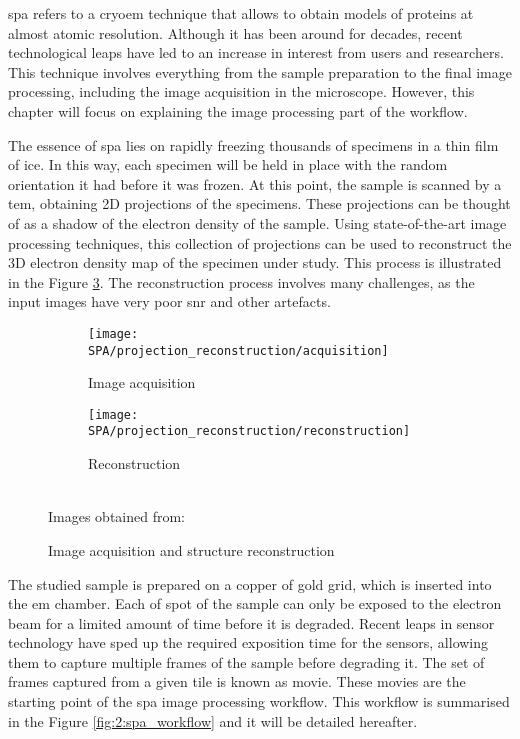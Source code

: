 \documentclass[../main.tex]{subfiles}
\begin{document}
\Gls{spa} refers to a \gls{cryoem} technique that allows to obtain models of proteins at almost atomic resolution. Although it has been around for decades, recent technological leaps have led to an increase in interest from users and researchers. This technique involves everything from the sample preparation to the final image processing, including the image acquisition in the microscope\cite{dimitry2019}. However, this chapter will focus on explaining the image processing part of the workflow.

The essence of \gls{spa} lies on rapidly freezing thousands of specimens in a thin film of ice. In this way, each specimen will be held in place with the random orientation it had before it was frozen. At this point, the sample is scanned by a \gls{tem}, obtaining 2D projections of the specimens. These projections can be thought of as a shadow of the electron density of the sample. Using state-of-the-art image processing techniques, this collection of projections can be used to reconstruct the 3D electron density map of the specimen under study. This process is illustrated in the Figure \ref{fig:2:acquisition_reconstruction}. The reconstruction process involves many challenges, as the input images have very poor \gls{snr} and other artefacts.

\begin{figure}[htbp]
    \centering
    \begin{subfigure}[b]{0.45\textwidth}
         \centering
         \texttt{[image: SPA/projection\_reconstruction/acquisition]}
         \caption{Image acquisition}
         \label{fig:2:projection_reconstruction:acquisition}
    \end{subfigure}
    \hfill
    \begin{subfigure}[b]{0.45\textwidth}
         \centering
         \texttt{[image: SPA/projection\_reconstruction/reconstruction]}
         \caption{Reconstruction}
         \label{fig:2:projection_reconstruction:reconstruction}
    \end{subfigure}\\
    Images obtained from: \cite{greg}
    \caption{Image acquisition and structure reconstruction}
    \label{fig:2:acquisition_reconstruction}
\end{figure}

The studied sample is prepared on a copper of gold grid, which is inserted into the \gls{em} chamber. Each of spot of the sample can only be exposed to the electron beam for a limited amount of time before it is degraded. Recent leaps in sensor technology have sped up the required exposition time for the sensors, allowing them to capture multiple frames of the sample before degrading it. The set of frames captured from a given tile is known as movie. These movies are the starting point of the \gls{spa} image processing workflow. This workflow is summarised in the Figure \ref{fig:2:spa_workflow} and it will be detailed hereafter. 
\end{document}
